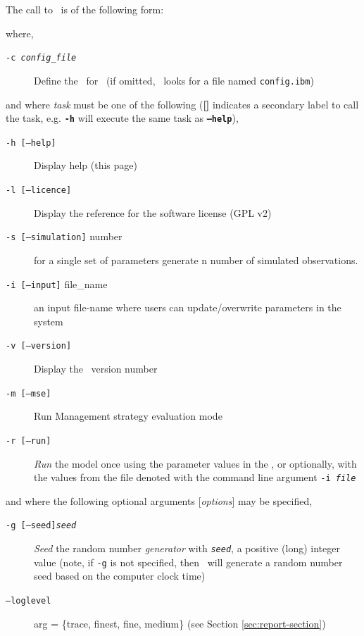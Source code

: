 The call to \IBM\ is of the following form: 

\texttt{}

where, 

\begin{description}
  \item [\texttt{-c \emph{config\_file}}] Define the \config\ for \IBM\ (if omitted, \IBM\ looks for a file named \texttt{config.ibm})
\end{description}

and where \emph{task} must be one of the following (\textbf{[]} indicates a secondary label to call the task, e.g. \textbf{\texttt{-h}} will execute the same task as \textbf{\texttt{--help}}),

\begin{description}
\item [\texttt{-h [--help]}] Display help (this page)
\item [\texttt{-l [--licence]}] Display the reference for the software license (GPL v2)
\item [\texttt{-s [--simulation]} number] for a single set of parameters generate n number of simulated observations.
\item [\texttt{-i [--input]} file\_name] an input file-name where users can update/overwrite parameters in the system
\item [\texttt{-v [--version]}] Display the \IBM\ version number
\item [\texttt{-m [--mse]}] Run Management strategy evaluation mode
\item [\texttt{-r [--run]}] \emph{Run} the model once using the parameter values in the \config, or optionally, with the values from the file denoted with the command line argument \texttt{-i \emph{file}}

\end{description}

and where the following optional arguments [\emph{options}] may be specified,

\begin{description}
\item [\texttt{-g [--seed]\emph{seed}}]  \emph{Seed} the random number \emph{generator} with \texttt{\emph{seed}}, a positive (long) integer value (note, if \texttt{-g} is not specified, then \IBM\ will  generate a random number seed based on the computer clock time)

\item [\texttt{--loglevel}] arg = \{trace, finest, fine, medium\} (see Section \ref{sec:report-section})
\end{description}

